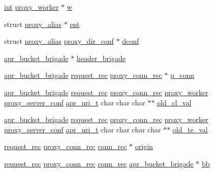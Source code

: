 \begin{DoxyCompactItemize}
\item 
\hyperlink{pcre_8txt_a42dfa4ff673c82d8efe7144098fbc198}{int} \hyperlink{structproxy__worker}{proxy\+\_\+worker} $\ast$ \hyperlink{group__MOD__PROXY_gab9a0c51666082a4ca5dd995ee972f77e}{w}
\item 
struct \hyperlink{structproxy__alias}{proxy\+\_\+alias} $\ast$ \hyperlink{group__MOD__PROXY_ga34404405efb1bb7f5b6dfd95e43d0181}{ent}
\item 
struct \hyperlink{structproxy__alias}{proxy\+\_\+alias} \hyperlink{structproxy__dir__conf}{proxy\+\_\+dir\+\_\+conf} $\ast$ \hyperlink{group__MOD__PROXY_ga01226e8c588429d47a24e72bda63a5e3}{dconf}
\item 
\hyperlink{structapr__bucket__brigade}{apr\+\_\+bucket\+\_\+brigade} $\ast$ \hyperlink{group__MOD__PROXY_ga685875bfd4f81a597447e253e20d0a4b}{header\+\_\+brigade}
\item 
\hyperlink{structapr__bucket__brigade}{apr\+\_\+bucket\+\_\+brigade} \hyperlink{structrequest__rec}{request\+\_\+rec} \hyperlink{structproxy__conn__rec}{proxy\+\_\+conn\+\_\+rec} $\ast$ \hyperlink{group__MOD__PROXY_ga9751c38cba4756a499d065b1f8a0c0b0}{p\+\_\+conn}
\item 
\hyperlink{structapr__bucket__brigade}{apr\+\_\+bucket\+\_\+brigade} \hyperlink{structrequest__rec}{request\+\_\+rec} \hyperlink{structproxy__conn__rec}{proxy\+\_\+conn\+\_\+rec} \hyperlink{structproxy__worker}{proxy\+\_\+worker} \hyperlink{structproxy__server__conf}{proxy\+\_\+server\+\_\+conf} \hyperlink{structapr__uri__t}{apr\+\_\+uri\+\_\+t} char char char $\ast$$\ast$ \hyperlink{group__MOD__PROXY_ga6e7929a1d8d93eba88370a05a26ab37b}{old\+\_\+cl\+\_\+val}
\item 
\hyperlink{structapr__bucket__brigade}{apr\+\_\+bucket\+\_\+brigade} \hyperlink{structrequest__rec}{request\+\_\+rec} \hyperlink{structproxy__conn__rec}{proxy\+\_\+conn\+\_\+rec} \hyperlink{structproxy__worker}{proxy\+\_\+worker} \hyperlink{structproxy__server__conf}{proxy\+\_\+server\+\_\+conf} \hyperlink{structapr__uri__t}{apr\+\_\+uri\+\_\+t} char char char char $\ast$$\ast$ \hyperlink{group__MOD__PROXY_ga0e5dc25dbb841b78fb7bc12b53b8f26c}{old\+\_\+te\+\_\+val}
\item 
\hyperlink{structrequest__rec}{request\+\_\+rec} \hyperlink{structproxy__conn__rec}{proxy\+\_\+conn\+\_\+rec} \hyperlink{structconn__rec}{conn\+\_\+rec} $\ast$ \hyperlink{group__MOD__PROXY_gac3d9b5c9be0a48d3b3b1203050929127}{origin}
\item 
\hyperlink{structrequest__rec}{request\+\_\+rec} \hyperlink{structproxy__conn__rec}{proxy\+\_\+conn\+\_\+rec} \hyperlink{structconn__rec}{conn\+\_\+rec} \hyperlink{structapr__bucket__brigade}{apr\+\_\+bucket\+\_\+brigade} $\ast$ \hyperlink{group__MOD__PROXY_ga9313a8a2814cff280d5d780c723def3c}{bb}

\end{DoxyCompactItemize}
